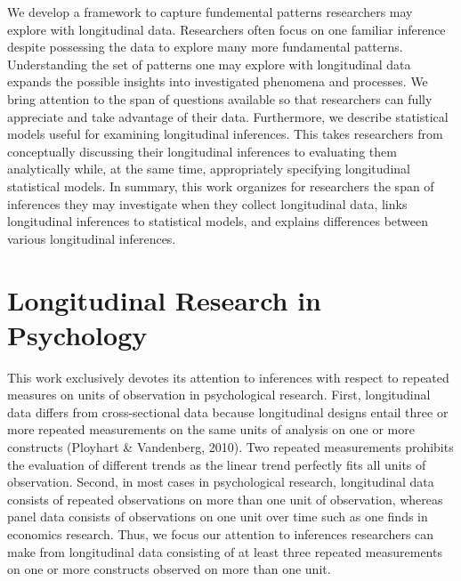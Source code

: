\documentclass[english,,man]{apa6}
\begin{document}
We develop a framework to capture fundemental patterns researchers may explore with longitudinal data. Researchers often focus on one familiar inference despite possessing the data to explore many more fundamental patterns. Understanding the set of patterns one may explore with longitudinal data expands the possible insights into investigated phenomena and processes. We bring attention to the span of questions available so that researchers can fully appreciate and take advantage of their data. Furthermore, we describe statistical models useful for examining longitudinal inferences. This takes researchers from conceptually discussing their longitudinal inferences to evaluating them analytically while, at the same time, appropriately specifying longitudinal statistical models. In summary, this work organizes for researchers the span of inferences they may investigate when they collect longitudinal data, links longitudinal inferences to statistical models, and explains differences between various longitudinal inferences.

\hypertarget{longitudinal-research-in-psychology}{%
\section{Longitudinal Research in Psychology}\label{longitudinal-research-in-psychology}}

This work exclusively devotes its attention to inferences with respect to repeated measures on units of observation in psychological research. First, longitudinal data differs from cross-sectional data because longitudinal designs entail three or more repeated measurements on the same units of analysis on one or more constructs (Ployhart \& Vandenberg, 2010). Two repeated measurements prohibits the evaluation of different trends as the linear trend perfectly fits all units of observation. Second, in most cases in psychological research, longitudinal data consists of repeated observations on more than one unit of observation, whereas panel data consists of observations on one unit over time such as one finds in economics research. Thus, we focus our attention to inferences researchers can make from longitudinal data consisting of at least three repeated measurements on one or more constructs observed on more than one unit.
\end{document}
